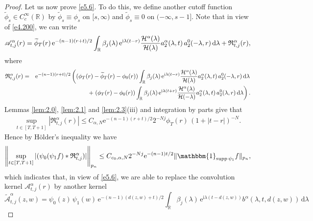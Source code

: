 \documentclass[11pt]{amsproc}
\newcommand{\R}{\mathbb{R}}
\newcommand{\e}{\mathrm{e}}
\newcommand{\indicator}{\mathbbm{1}}
\newcommand{\supp}{\mathop{\mathrm{supp}}}
\newcommand{\0}{\mathbf{0}}
\newcommand{\CK}{\mathscr{A}}
\newcommand{\CR}{\mathfrak{R}}
\newcommand{\bc}{{ \mathcal{H} }}
\renewcommand{\H}{\mathbb{H}}
\renewcommand{\i}{\mathrm{i}}
\renewcommand{\d}{\mathrm{d}}
\numberwithin{equation}{section}
\numberwithin{figure}{section}
\theoremstyle{definition}
\theoremstyle{remark}
\numberwithin{thm}{section}
\begin{document}
\begin{proof}
Let us now prove    \eqref{e5.6}.  To do this, we define another cutoff function $\widetilde{\phi}_s\in C_c^\infty(\R)$ by $\widetilde{\phi}_s\equiv \phi_s$ on $[s,\infty)$ and $\widetilde{\phi}_s\equiv 0$ on $(-\infty,s-1]$. Note that in view of \eqref{e4.200}, we can write
\begin{equation}\label{e5.8}
\CK^\alpha_{t,j}(r)=\widetilde{\phi}_T(r)\,\e^{-(n-1)(r+t)/2}\int_\R\beta_j(\lambda)\,\e^{\i\lambda(t-r)}{\bc^\alpha(\lambda)\over \bc(\lambda)}a_2^\alpha(\lambda,t)\,a_2^0(-\lambda,r)\,\d \lambda+ \CR^\alpha_{t,j}(r),\end{equation}
where
\begin{eqnarray*}
\CR^\alpha_{t,j}(r)&=&\e^{-(n-1)(r+t)/2}\left((\phi_T(r)-\widetilde{\phi}_T(r)-\phi_0(r))\int_\R\beta_j(\lambda)\,\e^{\i\lambda(t-r)}{\bc^\alpha(\lambda)\over \bc(\lambda)}a_2^\alpha(\lambda,t)\,a_2^0(-\lambda,r)\,\d \lambda\right.\\
&&+\left.(\phi_T(r)-\phi_0(r))\int_\R\beta_j(\lambda)\,\e^{\i\lambda(t+r)}{\bc^\alpha(\lambda)\over \bc(-\lambda)}a_2^\alpha(\lambda,t)\,a_2^0(\lambda,r)\,\d \lambda\right).
\end{eqnarray*}
Lemmas \ref{lem:2.0}, \ref{lem:2.1} and \ref{lem:2.3}(iii) and integration by parts give that
\begin{eqnarray*}
\sup_{t\in[T,T+1]}|\CR^\alpha_{t,j}(r)|\leq C_{\alpha,N}\e^{-(n-1)(r+t)/2}2^{-Nj}\phi_T(r)\,(1+|t-r|)^{-N}.
\end{eqnarray*}
Hence by H\"{o}lder's inequality we have
\begin{eqnarray*}
\left\|\sup_{t\in[T,T+1]}|(\psi_0(\psi_1f)*\CR^\alpha_{t,j})|\right\|_{p_n}%
\leq C_{c_0,\alpha,N}2^{-Nj}\e^{-(n-1)t/2}\|\indicator_{\supp \psi_1}f\|_{p_n},
\end{eqnarray*}
which indicates that, in view of \eqref{e5.6}, we are able to replace the convolution kernel $\CK^\alpha_{t,j}(r)$ by another kernel
\begin{equation}\label{e5.10}
\widetilde{\CK}^\alpha_{t,j}(z,w)=\psi_0(z)\,\psi_1(w)\,\e^{-(n-1)(d(z,w)+t)/2}\int_\R\beta_j(\lambda)\,\e^{\i\lambda(t-d(z,w))}b^\alpha(\lambda,t,d(z,w))\,\d \lambda

\end{equation}
\end{proof}
\end{document}
